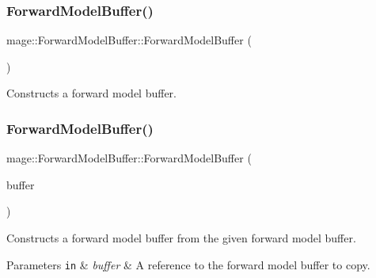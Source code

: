 \subsubsection{\texorpdfstring{Forward\+Model\+Buffer()}{ForwardModelBuffer()}\hspace{0.1cm}{\footnotesize\ttfamily [1/3]}}
{\footnotesize\ttfamily mage\+::\+Forward\+Model\+Buffer\+::\+Forward\+Model\+Buffer (\begin{DoxyParamCaption}{ }\end{DoxyParamCaption})}

Constructs a forward model buffer. \hypertarget{structmage_1_1_forward_model_buffer_a12c7548e793781896b51359801e7a274}{}\label{structmage_1_1_forward_model_buffer_a12c7548e793781896b51359801e7a274} 
\subsubsection{\texorpdfstring{Forward\+Model\+Buffer()}{ForwardModelBuffer()}\hspace{0.1cm}{\footnotesize\ttfamily [2/3]}}
{\footnotesize\ttfamily mage\+::\+Forward\+Model\+Buffer\+::\+Forward\+Model\+Buffer (\begin{DoxyParamCaption}\item[{const \hyperlink{structmage_1_1_forward_model_buffer}{Forward\+Model\+Buffer} \&}]{buffer }\end{DoxyParamCaption})\hspace{0.3cm}{\ttfamily [default]}}

Constructs a forward model buffer from the given forward model buffer.


\begin{DoxyParams}[1]{Parameters}
\mbox{\tt in}  & {\em buffer} & A reference to the forward model buffer to copy. \\
\hline
\end{DoxyParams}
\hypertarget{structmage_1_1_forward_model_buffer_a5a78b1a5191445413692592e807514af}{}\label{structmage_1_1_forward_model_buffer_a5a78b1a5191445413692592e807514af} 
